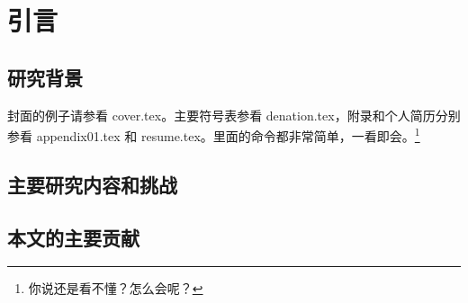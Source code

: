 

\chapter{引言}
\label{cha:intro}

\section{研究背景}
封面的例子请参看 cover.tex。主要符号表参看 denation.tex，附录和个人简历分别参看 appendix01.tex
和 resume.tex。里面的命令都非常简单，一看即会。\footnote{你说还是看不懂？怎么会呢？}

\section{主要研究内容和挑战}


\section{本文的主要贡献}
